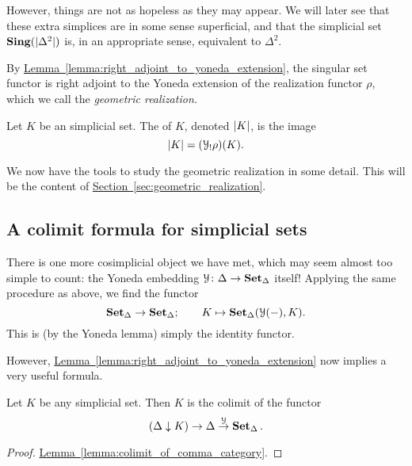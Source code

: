 \documentclass[main.tex]{subfiles}
\begin{document}
However, things are not as hopeless as they may appear. We will later see that these extra simplices are in some sense superficial, and that the simplicial set $\mathbf{Sing}({| \Delta^{2} |})$ is, in an appropriate sense, equivalent to $\Delta^{2}$.

By \hyperref[lemma:right_adjoint_to_yoneda_extension]{Lemma~\ref*{lemma:right_adjoint_to_yoneda_extension}}, the singular set functor is right adjoint to the Yoneda extension of the realization functor $\rho$, which we call the \emph{geometric realization.}

\begin{definition}
  \label{def:geometric_realization}
  Let $K$ be an simplicial set. The  of $K$, denoted ${| K |}$, is the image
  \begin{equation*}
    {| K |} = (\mathcal{Y}_{!}\rho)(K).
  \end{equation*}
\end{definition}

We now have the tools to study the geometric realization in some detail. This will be the content of \hyperref[sec:geometric_realization]{Section~\ref*{sec:geometric_realization}}.

\subsection{A colimit formula for simplicial sets}
\label{ssc:a_colimit_formula_for_simplicial_sets}

There is one more cosimplicial object we have met, which may seem almost too simple to count: the Yoneda embedding $\mathcal{Y}\colon \Delta \to \operatorname{\mathbf{Set}_{\Delta}}$ itself! Applying the same procedure as above, we find the functor
\begin{equation*}
  \operatorname{\mathbf{Set}_{\Delta}} \to \operatorname{\mathbf{Set}_{\Delta}};\qquad K \mapsto \operatorname{\mathbf{Set}_{\Delta}}(\mathcal{Y}(-), K).
\end{equation*}
This is (by the Yoneda lemma) simply the identity functor.

However, \hyperref[lemma:right_adjoint_to_yoneda_extension]{Lemma~\ref*{lemma:right_adjoint_to_yoneda_extension}} now implies a very useful formula.

\begin{proposition}
  \label{prop:colimit_formula_for_simplicial_set}
  Let $K$ be any simplicial set. Then $K$ is the colimit of the functor
  \begin{equation*}
    (\Delta \downarrow K) \to \Delta \overset{\mathcal{Y}}{\to} \operatorname{\mathbf{Set}_{\Delta}}.
  \end{equation*}
\end{proposition}
\begin{proof}
  \hyperref[lemma:colimit_of_comma_category]{Lemma~\ref*{lemma:colimit_of_comma_category}}.
\end{proof}
\end{document}
